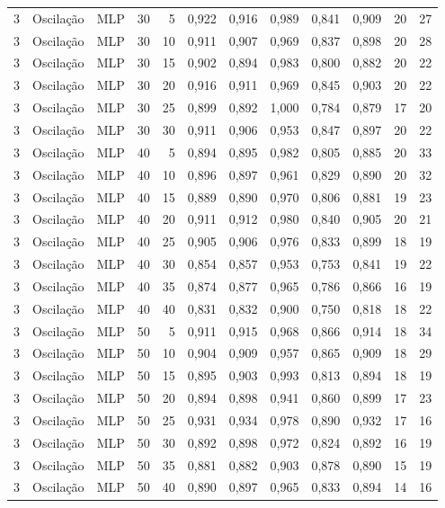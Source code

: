 \begin{longtable}{@{}rllrrrrrrrrr@{}}
3 & Oscilação & MLP & 30 & 5 & 0,922 & 0,916 & 0,989 & 0,841 & 0,909 & 20 & 27 \\
3 & Oscilação & MLP & 30 & 10 & 0,911 & 0,907 & 0,969 & 0,837 & 0,898 & 20 & 28 \\
3 & Oscilação & MLP & 30 & 15 & 0,902 & 0,894 & 0,983 & 0,800 & 0,882 & 20 & 22 \\
3 & Oscilação & MLP & 30 & 20 & 0,916 & 0,911 & 0,969 & 0,845 & 0,903 & 20 & 22 \\
3 & Oscilação & MLP & 30 & 25 & 0,899 & 0,892 & 1,000 & 0,784 & 0,879 & 17 & 20 \\
3 & Oscilação & MLP & 30 & 30 & 0,911 & 0,906 & 0,953 & 0,847 & 0,897 & 20 & 22 \\
3 & Oscilação & MLP & 40 & 5 & 0,894 & 0,895 & 0,982 & 0,805 & 0,885 & 20 & 33 \\
3 & Oscilação & MLP & 40 & 10 & 0,896 & 0,897 & 0,961 & 0,829 & 0,890 & 20 & 32 \\
3 & Oscilação & MLP & 40 & 15 & 0,889 & 0,890 & 0,970 & 0,806 & 0,881 & 19 & 23 \\
3 & Oscilação & MLP & 40 & 20 & 0,911 & 0,912 & 0,980 & 0,840 & 0,905 & 20 & 21 \\
3 & Oscilação & MLP & 40 & 25 & 0,905 & 0,906 & 0,976 & 0,833 & 0,899 & 18 & 19 \\
3 & Oscilação & MLP & 40 & 30 & 0,854 & 0,857 & 0,953 & 0,753 & 0,841 & 19 & 22 \\
3 & Oscilação & MLP & 40 & 35 & 0,874 & 0,877 & 0,965 & 0,786 & 0,866 & 16 & 19 \\
3 & Oscilação & MLP & 40 & 40 & 0,831 & 0,832 & 0,900 & 0,750 & 0,818 & 18 & 22 \\
3 & Oscilação & MLP & 50 & 5 & 0,911 & 0,915 & 0,968 & 0,866 & 0,914 & 18 & 34 \\
3 & Oscilação & MLP & 50 & 10 & 0,904 & 0,909 & 0,957 & 0,865 & 0,909 & 18 & 29 \\
3 & Oscilação & MLP & 50 & 15 & 0,895 & 0,903 & 0,993 & 0,813 & 0,894 & 18 & 19 \\
3 & Oscilação & MLP & 50 & 20 & 0,894 & 0,898 & 0,941 & 0,860 & 0,899 & 17 & 23 \\
3 & Oscilação & MLP & 50 & 25 & 0,931 & 0,934 & 0,978 & 0,890 & 0,932 & 17 & 16 \\
3 & Oscilação & MLP & 50 & 30 & 0,892 & 0,898 & 0,972 & 0,824 & 0,892 & 16 & 19 \\
3 & Oscilação & MLP & 50 & 35 & 0,881 & 0,882 & 0,903 & 0,878 & 0,890 & 15 & 19 \\
3 & Oscilação & MLP & 50 & 40 & 0,890 & 0,897 & 0,965 & 0,833 & 0,894 & 14 & 16 \\

\end{longtable}
